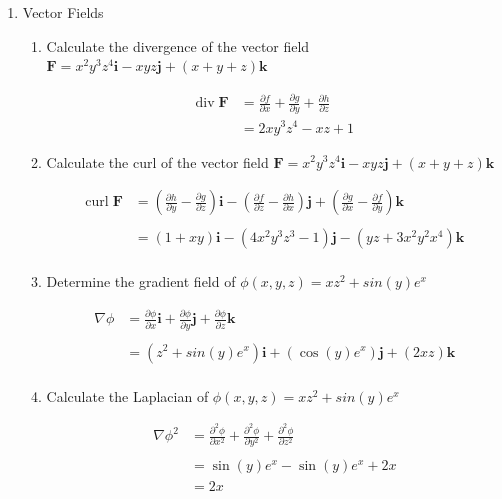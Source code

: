 \documentclass[a4paper,11pt]{article}
\begin{document}
\begin{preview}
\begin{enumerate}
\item Vector Fields

\begin{enumerate}
    \item Calculate the divergence of the vector field $\textbf{F} = x^2y^3z^4 \textbf{i} - xyz \textbf{j} + (x+y+z) \textbf{k}$
    
    \begin{align*}
        \mathrm{div} \; \textbf{F} &= \frac{\partial f}{\partial x } + \frac{\partial g}{\partial y } + \frac{\partial h}{\partial z }\\
        &= 2xy^3z^4 - xz + 1
    \end{align*}

    \item Calculate the curl of the vector field $\textbf{F} = x^2y^3z^4 \textbf{i} - xyz \textbf{j} + (x+y+z) \textbf{k}$
    
    \begin{align*}
        \mathrm{curl} \; \textbf{F} &= \left( \frac{\partial h}{\partial y} - \frac{\partial g}{\partial z} \right) \textbf{i} - \left( \frac{\partial f}{\partial z} - \frac{\partial h}{\partial x} \right) \textbf{j} + \left( \frac{\partial g}{\partial x} - \frac{\partial f}{\partial y} \right) \textbf{k}\\\\
        &= \left( 1 + xy \right) \textbf{i} - \left( 4x^2y^3z^3 - 1 \right) \textbf{j} - \left( yz + 3x^2y^2x^4 \right) \textbf{k}\\
    \end{align*}

    \item Determine the gradient field of $\phi(x,y,z) = xz^2 + sin(y)e^x$
    
    \begin{align*}
        \nabla \phi &= \frac{\partial \phi}{ \partial x} \textbf{i} + \frac{\partial \phi}{ \partial y} \textbf{j} + \frac{\partial \phi}{ \partial z} \textbf{k}\\\\
        &= \left(z^2 + sin(y)e^x\right) \textbf{i} + \left( \cos(y)e^x \right) \textbf{j} + \left( 2xz \right) \textbf{k}\\
    \end{align*}

    \item Calculate the Laplacian of $\phi(x,y,z) = xz^2 + sin(y)e^x$ 
    
    \begin{align*}
        \nabla \phi ^2 &= \frac{\partial^2 \phi}{ \partial x^2} + \frac{\partial^2 \phi}{ \partial y^2} + \frac{\partial^2 \phi}{ \partial z^2} \\\\
        &= \sin(y)e^x -\sin(y)e^x + 2x\\
        &=2x
    \end{align*}


\end{enumerate}
\end{enumerate}
\end{preview}
\end{document}
